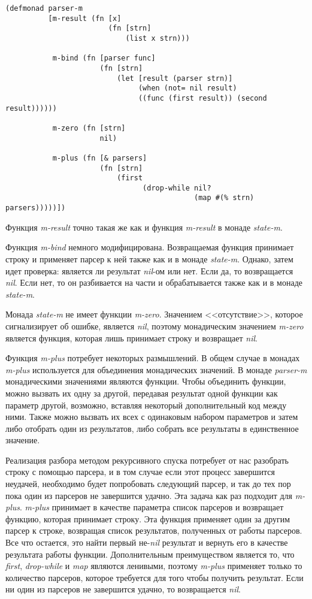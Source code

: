 \documentclass[a4paper,12pt]{article}
\newcommand{\cl}[1] {{\it #1}}
\begin{document}
\begin{verbatim}
(defmonad parser-m
          [m-result (fn [x]
                        (fn [strn]
                            (list x strn)))

           m-bind (fn [parser func]
                      (fn [strn]
                          (let [result (parser strn)]
                               (when (not= nil result)
                               ((func (first result)) (second result))))))

           m-zero (fn [strn]
                      nil)

           m-plus (fn [& parsers]
                      (fn [strn]
                          (first
                                (drop-while nil?
                                            (map #(% strn) parsers)))))])
\end{verbatim}


Функция \cl{m-result} точно такая же как и функция \cl{m-result} в монаде \cl{state-m}. 

Функция \cl{m-bind} немного модифицирована. Возвращаемая функция принимает
строку и применяет парсер к ней также как и в монаде \cl{state-m}. Однако, затем идет проверка: 
является ли результат \cl{nil}-ом или нет. Если да, то возвращается \cl{nil}. Если нет, то он разбивается на
части и обрабатывается также как и в монаде \cl{state-m}. 

Монада \cl{state-m} не имеет функции \cl{m-zero}. Значением <<отсутствие>>, которое сигнализирует об ошибке, 
является \cl{nil}, поэтому монадическим значением \cl{m-zero} является функция, которая лишь принимает строку и
возвращает \cl{nil}.

Функция \cl{m-plus} потребует некоторых размышлений. В общем случае в монадах \cl{m-plus} используется для 
объединения монадических значений. В монаде \cl{parser-m} монадическими значениями являются функции. 
Чтобы объединить функции, можно вызвать их одну за другой, передавая результат одной функции как
параметр другой, возможно, вставляя некоторый дополнительный код между ними. Также можно вызвать их всех
с одинаковым набором параметров и затем либо отобрать один из результатов, либо собрать все результаты
в единственное значение. 

Реализация разбора методом рекурсивного спуска потребует от нас разобрать строку с помощью
парсера, и в том случае если этот процесс завершится неудачей, необходимо будет попробовать следующий
парсер, и так до тех пор пока один из парсеров не завершится удачно. Эта задача как раз подходит
для \cl{m-plus}. \cl{m-plus} принимает в качестве параметра список парсеров и возвращает функцию, которая
принимает строку. Эта функция применяет один за другим парсер к строке, возвращая список результатов,
полученных от работы парсеров. Все что остается, это найти первый не-\cl{nil} результат и вернуть его 
в качестве результата работы функции. Дополнительным преимуществом является то, что \cl{first}, \cl{drop-while} и \cl{map} 
являются ленивыми, поэтому \cl{m-plus} применяет только то количество парсеров, которое требуется для того чтобы
получить результат. Если ни один из парсеров не завершится удачно, то возвращается \cl{nil}. 
\end{document}
